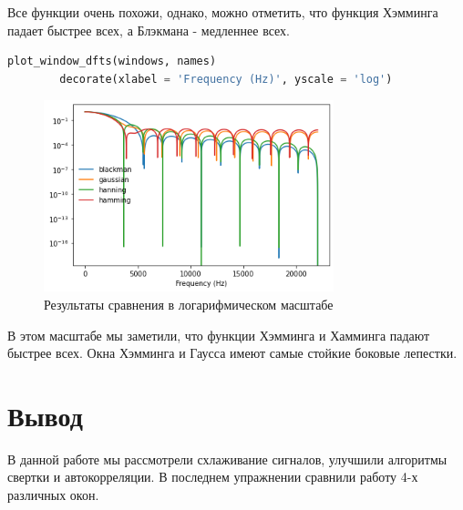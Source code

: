 \documentclass[a4paper, 12pt]{report}
\begin{document}
	Все функции очень похожи, однако, можно отметить, что функция Хэмминга падает быстрее всех, а Блэкмана - медленнее всех.
	\begin{lstlisting}[language=Python,caption=Логарифмический масштаб]
		plot_window_dfts(windows, names)
		decorate(xlabel = 'Frequency (Hz)', yscale = 'log')
	\end{lstlisting}
	\begin{figure}[H]
		\centering
		\includegraphics[width=0.75\textwidth]{task7.png}
		\caption{Результаты сравнения в логарифмическом масштабе}
		\label{fig:task7}
	\end{figure}
	В этом масштабе мы заметили, что функции Хэмминга и Хамминга падают быстрее всех. Окна Хэмминга и Гаусса имеют самые стойкие боковые лепестки. 

	\chapter{Вывод}
	В данной работе мы рассмотрели схлаживание сигналов, улучшили алгоритмы свертки и автокорреляции. В последнем упражнении  сравнили работу 4-х различных окон.
\end{document}
